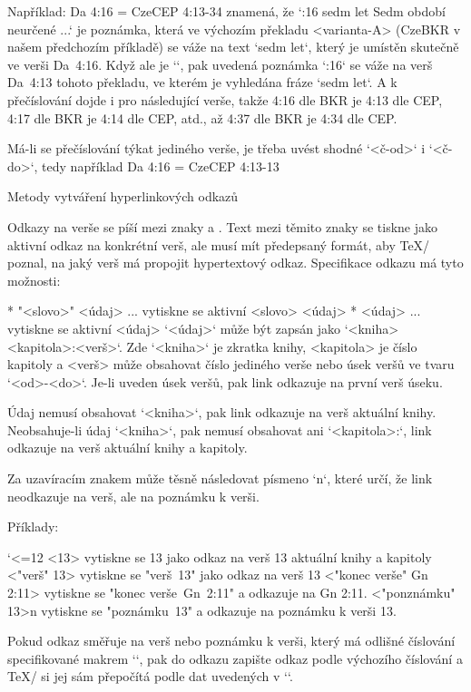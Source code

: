 Například:
\begtt
\renum Da 4:16 = CzeCEP 4:13-34
\endtt
znamená, že `:16 {sedm let} Sedm období neurčené ...` je poznámka,
která ve výchozím překladu <varianta-A> (CzeBKR v našem předchozím příkladě)
se váže na text `sedm let`, který je umístěn skutečně ve verši Da~4:16.
Když ale je `\def\tmark{CzeCEP}`, pak uvedená poznámka `:16`
se váže na verš Da~4:13 tohoto překladu, ve kterém je vyhledána fráze
`sedm let`. A k přečíslování dojde i pro následující verše, takže
4:16 dle BKR je 4:13 dle CEP, 4:17 dle BKR je 4:14 dle CEP, atd., až
4:37 dle BKR je 4:34 dle CEP.

Má-li se přečíslování týkat jediného verše, je třeba uvést shodné
`<č-od>` i `<č-do>`, tedy například
\begtt
\renum Da 4:16 = CzeCEP 4:13-13
\endtt

\sec[odkazy] Metody vytváření hyperlinkových odkazů

Odkazy na verše se píší
mezi znaky \code{<} a \code{>}. Text mezi těmito znaky se tiskne jako
aktivní odkaz na konkrétní verš, ale musí mít předepsaný formát, aby
\TeX/ poznal, na jaký verš má propojit hypertextový odkaz.
Specifikace odkazu má tyto možnosti:

\begitems
* "<slovo>" <údaj> ... vytiskne se aktivní <slovo> <údaj>
* <údaj> ... vytiskne se aktivní <údaj>
\enditems
%
`<údaj>` může být zapsán jako
`<kniha> <kapitola>:<verš>`. Zde `<kniha>` je zkratka knihy, <kapitola>
je číslo kapitoly a <verš> může obsahovat číslo jediného verše
nebo úsek veršů ve tvaru `<od>-<do>`. Je-li uveden úsek veršů, pak link
odkazuje na první verš úseku.

Údaj nemusí obsahovat `<kniha>`, pak link odkazuje na verš aktuální knihy.
Neobsahuje-li údaj `<kniha>`, pak nemusí obsahovat ani `<kapitola>:`, link
odkazuje na verš aktuální knihy a kapitoly.

Za uzavíracím znakem \code{>} může těsně následovat písmeno `n`, které určí, že
link neodkazuje na verš, ale na poznámku k verši.

Příklady:

\begtt \catcode`<=12
<13> vytiskne se 13 jako odkaz na verš 13 aktuální knihy a kapitoly
<"verš" 13> vytiskne se "verš~13" jako odkaz na verš 13
<"konec verše" Gn 2:11> vytiskne se "konec verše~Gn~2:11" a odkazuje na Gn 2:11.
<"ponznámku" 13>n vytiskne se "poznámku~13" a odkazuje na poznámku k verši 13.
\endtt

Pokud odkaz směřuje na verš nebo poznámku k verši, který má odlišné
číslování specifikované makrem `\renum`, pak do odkazu zapište odkaz podle
výchozího číslování a \TeX/ si jej sám přepočítá podle dat uvedených v
`\renum`.


